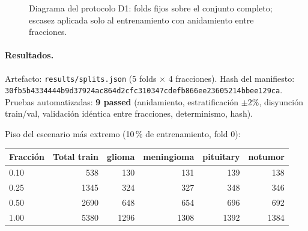 \begin{figure}[ht]
\centering
{}
\caption{Diagrama del protocolo D1: folds fijos sobre el conjunto completo; escasez
aplicada solo al entrenamiento con anidamiento entre fracciones.}
\label{fig:diagrama-d1-task6}
\end{figure}

\paragraph{Resultados.}
Artefacto: \texttt{results/splits.json} (5 folds $\times$ 4 fracciones).
Hash del manifiesto: \texttt{30fb5b4334444b9d37924ac864d2cfc310347cdefb866ee23605214bbee129ca}.
Pruebas automatizadas: \textbf{9 passed} (anidamiento, estratificación $\pm 2\%$,
disyunción train/val, validación idéntica entre fracciones, determinismo, hash).

Piso del escenario más extremo (10\,\% de entrenamiento, fold 0):

\begin{center}
\begin{tabular}{lrrrrr}\hline
\textbf{Fracción} & \textbf{Total train} & \textbf{glioma} & \textbf{meningioma} & \textbf{pituitary} & \textbf{notumor} \\\hline
0.10 & 538 & 130 & 131 & 139 & 138 \\
0.25 & 1345 & 324 & 327 & 348 & 346 \\
0.50 & 2690 & 648 & 654 & 696 & 692 \\
1.00 & 5380 & 1296 & 1308 & 1392 & 1384 \\\hline
\end{tabular}
\end{center}

